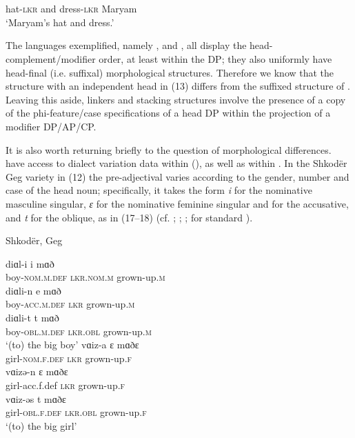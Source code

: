 \documentclass[output=paper]{langsci/langscibook}
\begin{document}
\ea%
          \citep[38]{Philip2012}\label{ex:manzini:16}\\
    \gll{} \\
          hat-\textsc{lkr}   and   dress-\textsc{lkr}   Maryam\\
    \glt  ‘Maryam’s hat and dress.’ 
\z
                    
The languages exemplified, namely ,  and , all display the head-complement\slash modifier order, at least within the DP; they also uniformly have head-final (i.e. suffixal) morphological structures. Therefore we know that the  structure with an independent head in (13) differs from the suffixed structure of . Leaving this aside, linkers and stacking structures involve the presence of a copy of the phi-feature\slash case specifications of a head DP within the projection of a modifier DP\slash AP\slash CP.   

It is also worth returning briefly to the question of morphological differences. \citet{Franco2015} have access to dialect variation data within  (\citealt{Manzini2011Grammatical,Manzini2011Reducing}), as well as within . In the Shkodër Geg  variety in (12) the pre-ad\-jec\-ti\-val  varies according to the gender, number and case of the head noun; specifically, it takes the form \textit{i} for the nominative masculine singular, \textit{ɛ} for the nominative feminine singular and for the accusative, and \textit{t} for the oblique, as in (17--18) (cf. \citealt{Solano1972}; \citealt{Camaj1984}; \citealt{Turano2004}; \citealt{Campos2008} for standard ).

\ea%
    Shkodër, Geg \label{ex:manzini:17}\\
    \begin{xlista}
    \ex
    \gll diɑl-i      i     mɑð           \\
         boy-\textsc{nom.m.def}   \textsc{lkr.nom.m}  grown-up.\textsc{m}\\
    \ex
    \gll diɑli-n     e     mɑð    \\
         boy-\textsc{acc.m.def}     \textsc{lkr}    grown-up.\textsc{m}\\
    \ex
    \gll diɑli-t              t     mɑð  \\
         boy-\textsc{obl.m.def}  \textsc{lkr.obl}  grown-up.\textsc{m}\\
    \glt ‘(to) the big boy’
    \gll vɑiz-a     ɛ     mɑðɛ    \\
         girl-\textsc{nom.f.def}   \textsc{lkr}    grown-up.\textsc{f} \\
    \gll vɑizə-n     ɛ     mɑðɛ    \\
         girl-acc.f.def    \textsc{lkr}    grown-up.\textsc{f}\\
    \gll vɑiz-əs    t     mɑðɛ \\
         girl-\textsc{obl.f.def}    \textsc{lkr.obl}  grown-up.\textsc{f}\\
    \glt ‘(to) the big girl’
    \end{xlista}
\z
\end{document}
